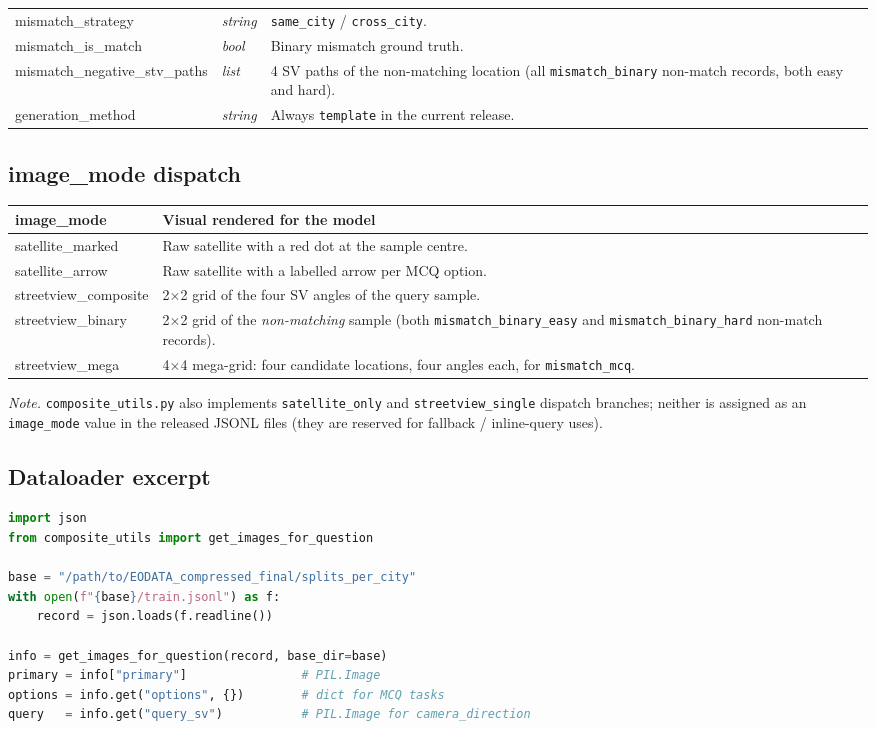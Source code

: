 \documentclass[11pt,a4paper]{article}
\begin{document}
\begin{tabularx}{\linewidth}{@{}>{\ttfamily\small}l>{\itshape\small}l X@{}}
mismatch\_strategy                   & string & \texttt{same\_city} / \texttt{cross\_city}. \\
mismatch\_is\_match                  & bool   & Binary mismatch ground truth. \\
mismatch\_negative\_stv\_paths       & list   & 4 SV paths of the non-matching location (all \texttt{mismatch\_binary} non-match records, both easy and hard). \\
generation\_method                  & string & Always \texttt{template} in the current release. \\
\bottomrule
\end{tabularx}

\subsection{image\_mode dispatch}

\begin{tabularx}{\linewidth}{@{}>{\ttfamily\small}l X@{}}
\toprule
\textnormal{\textbf{image\_mode}} & \textbf{Visual rendered for the model} \\
\midrule
satellite\_marked     & Raw satellite with a red dot at the sample centre. \\
satellite\_arrow      & Raw satellite with a labelled arrow per MCQ option. \\
streetview\_composite & 2$\times$2 grid of the four SV angles of the query sample. \\
streetview\_binary    & 2$\times$2 grid of the \emph{non-matching} sample (both \texttt{mismatch\_binary\_easy} and \texttt{mismatch\_binary\_hard} non-match records). \\
streetview\_mega      & 4$\times$4 mega-grid: four candidate locations,
                        four angles each, for \texttt{mismatch\_mcq}. \\
\bottomrule
\end{tabularx}

\noindent\textit{Note.} \texttt{composite\_utils.py} also implements
\texttt{satellite\_only} and \texttt{streetview\_single} dispatch
branches; neither is assigned as an \texttt{image\_mode} value in the
released JSONL files (they are reserved for fallback / inline-query
uses).

\subsection{Dataloader excerpt}

\begin{lstlisting}[language=Python]
import json
from composite_utils import get_images_for_question

base = "/path/to/EODATA_compressed_final/splits_per_city"
with open(f"{base}/train.jsonl") as f:
    record = json.loads(f.readline())

info = get_images_for_question(record, base_dir=base)
primary = info["primary"]                # PIL.Image
options = info.get("options", {})        # dict for MCQ tasks
query   = info.get("query_sv")           # PIL.Image for camera_direction
\end{lstlisting}
\end{document}
